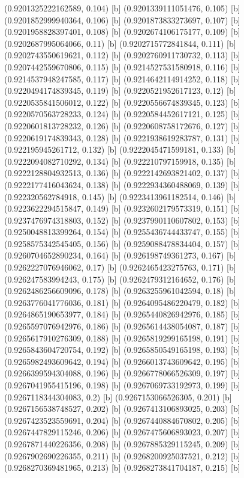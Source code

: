 {{{(0.9201325222162589, 0.104) [b] 
(0.9201339111051476, 0.105) [b] 
(0.9201852999940364, 0.106) [b] 
(0.9201873833273697, 0.107) [b] 
(0.9201958828397401, 0.108) [b] 
(0.9202674106175177, 0.109) [b] 
(0.9202687995064066, 0.11) [b] 
(0.9202715772841844, 0.111) [b] 
(0.9202743550619621, 0.112) [b] 
(0.9202760911730732, 0.113) [b] 
(0.9207442559670806, 0.115) [b] 
(0.9214527531580918, 0.116) [b] 
(0.9214537948247585, 0.117) [b] 
(0.9214642114914252, 0.118) [b] 
(0.9220494174839345, 0.119) [b] 
(0.9220521952617123, 0.12) [b] 
(0.9220535841506012, 0.122) [b] 
(0.9220556674839345, 0.123) [b] 
(0.9220570563728233, 0.124) [b] 
(0.9220584452617121, 0.125) [b] 
(0.9220601813728232, 0.126) [b] 
(0.9220608758172676, 0.127) [b] 
(0.9220619174839343, 0.128) [b] 
(0.9221938619283787, 0.131) [b] 
(0.922195945261712, 0.132) [b] 
(0.9222045471599181, 0.133) [b] 
(0.9222094082710292, 0.134) [b] 
(0.922210797159918, 0.135) [b] 
(0.9222128804932513, 0.136) [b] 
(0.9222142693821402, 0.137) [b] 
(0.9222177416043624, 0.138) [b] 
(0.9222934360488069, 0.139) [b] 
(0.922320562784918, 0.145) [b] 
(0.9223413961182514, 0.146) [b] 
(0.9223622294515847, 0.149) [b] 
(0.9232602179573319, 0.151) [b] 
(0.9237476974318803, 0.152) [b] 
(0.9237990110607802, 0.153) [b] 
(0.9250048813399264, 0.154) [b] 
(0.9255436744433747, 0.155) [b] 
(0.9258575342545405, 0.156) [b] 
(0.9259088478834404, 0.157) [b] 
(0.9260704652890234, 0.164) [b] 
(0.926198749361273, 0.167) [b] 
(0.9262227076946062, 0.17) [b] 
(0.9262465423275763, 0.171) [b] 
(0.926247583994243, 0.175) [b] 
(0.9262479312164652, 0.176) [b] 
(0.9262486256609096, 0.178) [b] 
(0.9263255961042594, 0.18) [b] 
(0.9263776041776036, 0.181) [b] 
(0.9264095486220479, 0.182) [b] 
(0.9264865190653977, 0.184) [b] 
(0.9265440826942976, 0.185) [b] 
(0.9265597076942976, 0.186) [b] 
(0.9265614438054087, 0.187) [b] 
(0.9265617910276309, 0.188) [b] 
(0.9265819299165198, 0.191) [b] 
(0.9265843604720754, 0.192) [b] 
(0.9265850549165198, 0.193) [b] 
(0.9265982493609642, 0.194) [b] 
(0.9266013743609642, 0.195) [b] 
(0.9266399594304088, 0.196) [b] 
(0.9266778066526309, 0.197) [b] 
(0.9267041955415196, 0.198) [b] 
(0.9267069733192973, 0.199) [b] 
(0.9267118344304083, 0.2) [b] 
(0.9267153066526305, 0.201) [b] 
(0.9267156538748527, 0.202) [b] 
(0.9267413106893025, 0.203) [b] 
(0.9267423523559691, 0.204) [b] 
(0.9267440884670802, 0.205) [b] 
(0.9267447829115246, 0.206) [b] 
(0.9267475606893023, 0.207) [b] 
(0.9267871440226356, 0.208) [b] 
(0.9267885329115245, 0.209) [b] 
(0.9267902690226355, 0.211) [b] 
(0.9268200925037521, 0.212) [b] 
(0.9268270369481965, 0.213) [b] 
(0.9268273841704187, 0.215) [b] 
}}}
